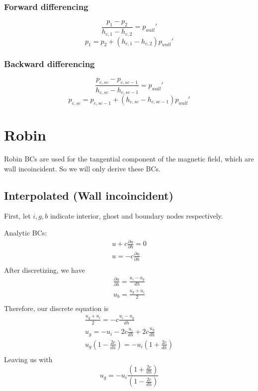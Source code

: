\documentclass[11pt]{article}
\newcommand{\PD}{\partial}
\begin{document}
\subsubsection{Forward differencing}
\begin{equation}
	\frac{p_1-p_2}{h_{c,1}-h_{c,2}} = p_{wall}'
\end{equation}
\begin{equation}
	p_1 = p_2 + (h_{c,1} - h_{c,2}) p_{wall}'
\end{equation}
\subsubsection{Backward differencing}
\begin{equation}
	\frac{p_{c,sc}-p_{c,sc-1}}{h_{c,sc}-h_{c,sc-1}} = p_{wall}'
\end{equation}
\begin{equation}
	p_{c,sc} = p_{c,sc-1} + (h_{c,sc} - h_{c,sc-1}) p_{wall}'
\end{equation}



\section{Robin}
Robin BCs are used for the tangential component of the magnetic field, which are wall incoincident.
So we will only derive these BCs.

\subsection{Interpolated (Wall incoincident)}
First, let $i,g,b$ indicate interior, ghost and boundary nodes respectively.

Analytic BCs:
\begin{equation}\begin{aligned}
	u + c \frac{\PD u}{\PD h} = 0 \\
	u =-c \frac{\PD u}{\PD h} \\
\end{aligned}\end{equation}
After discretizing, we have
\begin{equation}\begin{aligned}
	\frac{\PD u}{\PD h} = \frac{u_i-u_g}{dh} \\
	u_b = \frac{u_g+u_i}{2} \\
\end{aligned}\end{equation}
Therefore, our discrete equation is
\begin{equation}\begin{aligned}
	\frac{u_g+u_i}{2} = -c \frac{u_i-u_g}{dh} \\
	u_g = -u_i - 2c \frac{u_i}{dh} + 2c \frac{u_g}{dh} \\
	u_g \left( 1 - \frac{2 c}{dh} \right) = - u_i \left( 1 + \frac{2c}{dh} \right) \\
\end{aligned}\end{equation}
Leaving us with
\begin{equation}
	\boxed{
	u_g = - u_i \frac{\left(1 + \frac{2c}{dh} \right)}{\left(1 - \frac{2c}{dh} \right)}
	}
\end{equation}
\end{document}
